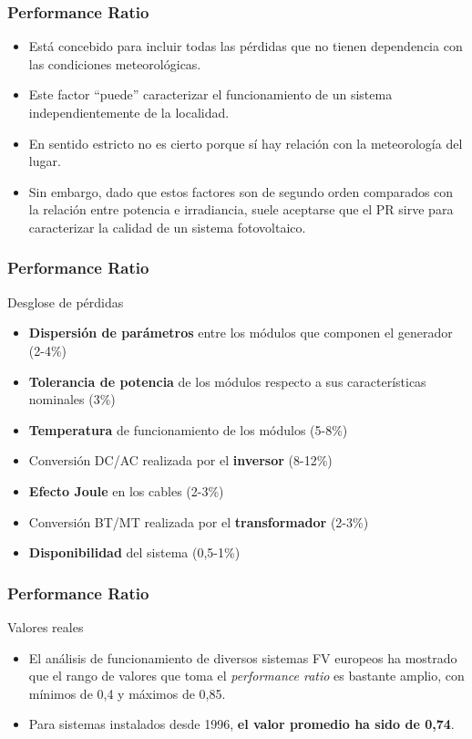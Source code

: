 \documentclass[serif, xcolor=dvipsnames]{beamer}
\begin{document}
\begin{frame}
  \frametitle{Performance Ratio}
  \begin{itemize}
  \item Está concebido para incluir todas las pérdidas que no tienen
    dependencia con las condiciones meteorológicas.
  \item Este factor {}``puede'' caracterizar el funcionamiento de un
    sistema independientemente de la localidad.
  \item En sentido estricto no es cierto porque sí hay relación con la
    meteorología del lugar.
  \item Sin embargo, dado que estos factores son de segundo orden
    comparados con la relación entre potencia e irradiancia, suele
    aceptarse que el PR sirve para caracterizar la calidad de un
    sistema fotovoltaico.
  \end{itemize}

\end{frame}
\begin{frame}
  \frametitle{Performance Ratio}
  \begin{block} {Desglose de pérdidas}
    \begin{itemize}
    \item \textbf{Dispersión de parámetros} entre los módulos que
      componen el generador (2-4\%)
    \item \textbf{Tolerancia de potencia} de los módulos respecto a
      sus características nominales (3\%)
    \item \textbf{Temperatura} de funcionamiento de los módulos
      (5-8\%)
    \item Conversión DC/AC realizada por el \textbf{inversor} (8-12\%)
    \item \textbf{Efecto Joule} en los cables (2-3\%)
    \item Conversión BT/MT realizada por el \textbf{transformador}
      (2-3\%)
    \item \textbf{Disponibilidad} del sistema (0,5-1\%)
    \end{itemize}
  \end{block}

\end{frame}

\begin{frame}
  \frametitle{Performance Ratio}
  \begin{block} {Valores reales}
    \begin{itemize}
    \item El análisis de funcionamiento de diversos sistemas FV
      europeos ha mostrado que el rango de valores que toma el
      \emph{performance ratio} es bastante amplio, con mínimos de 0,4
      y máximos de 0,85.
    \item Para sistemas instalados desde 1996, \textbf{el valor
        promedio ha sido de 0,74}.
    \end{itemize}
  \end{block}
\end{frame}
\end{document}
